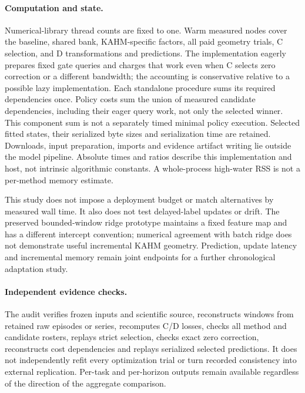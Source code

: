 \paragraph{Computation and state.}
Numerical-library thread counts are fixed to one. Warm measured nodes
cover the baseline, shared bank, KAHM-specific factors, all paid geometry
trials, C selection, and D transformations and predictions. The implementation eagerly prepares
fixed gate queries and charges that work even when C selects zero
correction or a different bandwidth; the accounting is conservative
relative to a possible lazy implementation.
Each standalone procedure sums its required dependencies once. Policy
costs sum the union of measured candidate dependencies, including their
eager query work, not only the selected winner. This component sum is not
a separately timed minimal policy execution. Selected fitted states, their serialized byte sizes and
serialization time are retained. Downloads, input preparation, imports
and evidence artifact writing lie outside the model pipeline. Absolute
times and ratios describe this implementation and host, not intrinsic
algorithmic constants. A whole-process high-water RSS is not a
per-method memory estimate.

This study does not impose a deployment budget or match alternatives by
measured wall time. It also does not test delayed-label updates or drift.
The preserved bounded-window ridge prototype maintains a fixed feature
map and has a different intercept convention; numerical agreement with
batch ridge does not demonstrate useful incremental KAHM geometry.
Prediction, update latency and incremental memory remain joint endpoints
for a further chronological adaptation study.

\paragraph{Independent evidence checks.}
The audit verifies frozen inputs and scientific source, reconstructs
windows from retained raw episodes or series, recomputes C/D losses,
checks all method and candidate rosters, replays strict selection,
checks exact zero correction, reconstructs cost dependencies and
replays serialized selected predictions. It does not independently
refit every optimization trial or turn recorded consistency into
external replication. Per-task and per-horizon outputs remain available
regardless of the direction of the aggregate comparison.

